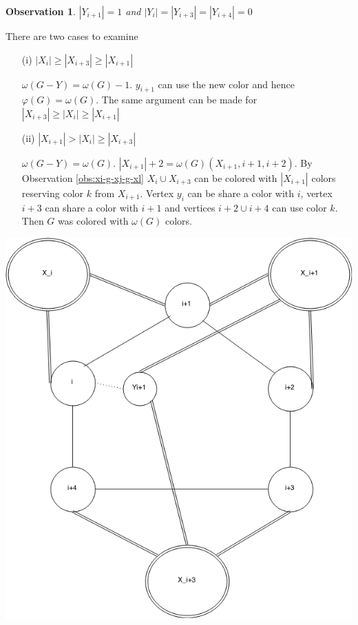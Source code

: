 \documentclass[12pt]{article}
\newtheorem{Observation}[Theorem]{Observation}
\begin{document}
\begin{Observation}\label{obs:yi1}
$|Y_{i+1}| = 1$ and $|Y_i| = |Y_{i+3}| = |Y_{i+4}| = 0$
\end{Observation}
\begin{minipage}{0.5\textwidth}%
	 There are two cases to examine

	\begin{itemize}
	\item[(i)]
		$|X_i| \geq |X_{i+3}| \geq |X_{i+1}|$

		$\omega(G - Y) = \omega(G) - 1$. $y_{i+1}$ can use the new color and hence $\varphi(G) = \omega(G)$. The same argument can be made for $|X_{i+3}| \geq |X_i| \geq |X_{i+1}|$ 

	\item[(ii)]
		$|X_{i+1}| > |X_i| \geq |X_{i+3}|$

		$\omega(G - Y) = \omega(G)$. $|X_{i+1}| +2 = \omega(G) (X_{i+1}, i+1,i+2)$. By Observation \ref{obs:xi-g-xj-g-xl} $X_{i} \cup X_{i+3}$ can be colored with $|X_{i+1}|$ colors reserving color $k$ from $X_{i+1}$. Vertex $y_i$ can be share a color with $i$, vertex $i+3$ can share a color with $i+1$ and vertices $i+2 \cup i+4$ can use color $k$. Then $G$ was colored with $\omega(G)$ colors.
	\end{itemize}
\end{minipage}
\hfill
\begin{minipage}{0.5\textwidth}\raggedleft
	\includegraphics[width=\linewidth]{Yi1.png}
\end{minipage}
\end{document}
